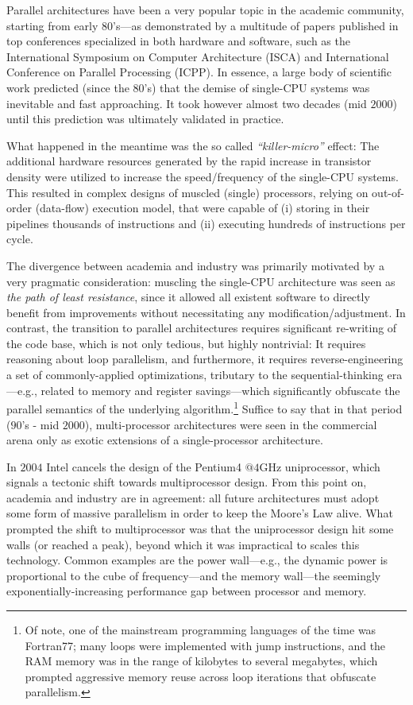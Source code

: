 \documentclass[acmsmall,review]{acmart}\settopmatter{printfolios=true,printccs=false,printacmref=false}
\begin{document}
Parallel architectures have been a very popular topic in the academic 
community, starting from early $80$'s---as demonstrated by a multitude
of papers published in top conferences specialized in both hardware
and software, such as the International Symposium on Computer 
Architecture (ISCA) and International Conference on Parallel 
Processing (ICPP).  In essence, a large body of scientific work 
predicted (since the $80$'s) that the demise of single-CPU systems 
was inevitable and fast approaching. It took however almost two 
decades (mid $2000$) until this prediction was ultimately validated 
in practice. 

What happened in the meantime was the so called \emph{``killer-micro''}
effect: The additional hardware resources generated by the rapid increase 
in transistor density were utilized to increase the speed/frequency of the
single-CPU systems. This resulted in complex designs of muscled (single) 
processors, relying on out-of-order (data-flow) execution model, that 
were capable of 
(i)  storing in their pipelines thousands of instructions and 
(ii) executing hundreds of instructions per cycle.

The divergence between academia and industry was primarily motivated by  
a very pragmatic consideration:  muscling the single-CPU architecture
was seen as \emph{the path of least resistance}, since it allowed all 
existent software to directly benefit from improvements without 
necessitating any modification/adjustment.
In contrast, the transition to parallel architectures requires significant
re-writing of the code base, which is not only tedious, but highly 
nontrivial: It requires reasoning about loop parallelism, and furthermore, 
it requires reverse-engineering a set of commonly-applied optimizations, 
tributary to the sequential-thinking era---e.g., related
to memory and register savings---which significantly obfuscate the 
parallel semantics of the underlying algorithm.\footnote{
Of note, one of the mainstream programming languages of the time was
Fortran77; many loops were implemented with jump instructions, and
the RAM memory was in the range of kilobytes to several megabytes, which 
prompted aggressive memory reuse across loop iterations that obfuscate
parallelism.
}
%
Suffice to say that in that period ($90$'s - mid $2000$), multi-processor
architectures were seen in the commercial arena only as exotic extensions
of a single-processor architecture. 

In $2004$ Intel cancels the design of the Pentium4 $@ 4$GHz uniprocessor,
which signals a tectonic shift towards multiprocessor design. From this
point on, academia and industry are in agreement: all future architectures 
must adopt some form of massive parallelism in order to keep the Moore's 
Law alive.  What prompted the shift to multiprocessor was that the uniprocessor 
design hit some walls (or reached a peak), beyond which it was impractical 
to scales this technology. Common examples are the power wall---e.g., the 
dynamic power is proportional to the cube of frequency---and the memory 
wall---the seemingly exponentially-increasing performance gap between 
processor and memory. 
\end{document}
